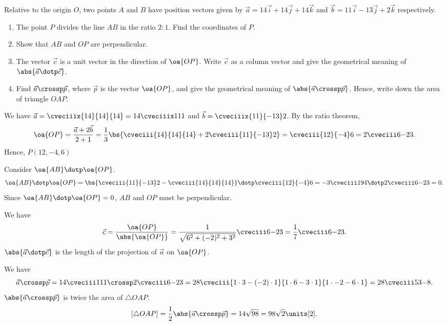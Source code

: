\begin{problem}
    Relative to the origin $O$, two points $A$ and $B$ have position vectors given by $\vec a = 14 \vec i + 14 \vec j + 14 \vec k$ and $\vec b = 11\vec i - 13 \vec j + 2 \vec k$ respectively.

    \begin{enumerate}
        \item The point $P$ divides the line $AB$ in the ratio $2:1$. Find the coordinates of $P$.
        \item Show that $AB$ and $OP$ are perpendicular.
        \item The vector $\vec c$ is a unit vector in the direction of $\oa{OP}$. Write $\vec c$ as a column vector and give the geometrical meaning of $\abs{\vec a \dotp \vec c}$.
        \item Find $\vec a \crossp \vec p$, where $\vec p$ is the vector $\oa{OP}$, and give the geometrical meaning of $\abs{\vec a \crossp \vec p}$. Hence, write down the area of triangle $OAP$.
    \end{enumerate}
\end{problem}
\begin{solution}
    \begin{ppart}
        We have $\vec a = \cveciiix{14}{14}{14} = 14 \cveciiix111$ and $\vec b = \cveciiix{11}{-13}2$. By the ratio theorem, \[\oa{OP} = \frac{\vec a + 2\vec b}{2 + 1} = \frac13 \bs{\cveciii{14}{14}{14} + 2\cveciii{11}{-13}2} = \cveciii{12}{-4}6 = 2\cveciii6{-2}3.\] Hence, $P(12, -4, 6)$
    \end{ppart}
    \begin{ppart}
        Consider $\oa{AB} \dotp \oa{OP}$. \[\oa{AB} \dotp \oa{OP} = \bs{\cveciii{11}{-13}2 -  \cveciii{14}{14}{14}} \dotp \cveciii{12}{-4}6 = -3\cveciii194 \dotp 2\cveciii6{-2}3 = 0.\] Since $\oa{AB} \dotp \oa{OP} = 0$, $AB$ and $OP$ must be perpendicular.
    \end{ppart}
    \begin{ppart}
        We have \[\vec c = \frac{\oa{OP}}{\abs{\oa{OP}}} = \frac1{\sqrt{6^2 + (-2)^2 + 3^2}}\cveciii6{-2}3 = \frac17 \cveciii6{-2}3.\] $\abs{\vec a \dotp \vec c}$ is the length of the projection of $\vec a$ on $\oa{OP}$.
    \end{ppart}
    \begin{ppart}
        We have \[\vec a \crossp \vec p = 14 \cveciii111 \crossp 2 \cveciii6{-2}3 = 28 \cveciii{1 \cdot 3 - (-2) \cdot 1}{1 \cdot 6 - 3 \cdot 1}{1 \cdot -2 - 6 \cdot 1} = 28 \cveciii53{-8}.\] $\abs{\vec a \crossp \vec p}$ is twice the area of $\triangle OAP$. \[[\triangle OAP] = \frac12 \abs{\vec a \crossp \vec p} = 14 \sqrt{98} = 98 \sqrt 2 \units[2].\]
    \end{ppart}
\end{solution}

